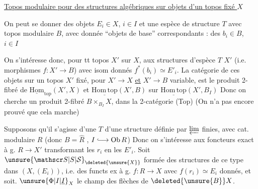 \uline{Topos modulaire pour des structures algébriques
 sur objets  d'un topos fixé  $X$}

 On peut se donner des objets $E_i\in X$, $i\in I$
et  une espèce de structure $T$ avec
topos modulaire $B$,  avec donnée
``objets de base'' correspondants : des $b_i\in B$, $i\in I$

On s'intéresse donc, pour tt topos $X'$ sur $X$,
aux structures d'espèce $T$  $X'$ 
(i.e. morphismes $f:X'\longrightarrow B$)  avec
isom donnés $f^*(b_i)\simeq E'_i$. La catégorie
de ces objets sur un topos $X'$
fixé, pour $X'\longrightarrow X$ \uline{et} $X'\longrightarrow B$
variable, est le produit 2-fibré de $\underline{\mathrm{Hom}}_{\mathrm{top}}(X',X)$ et
$\underline{\mathrm{Hom}\,\mathrm{top}}(X',B)$ sur $\underline{\mathrm{Hom}\,\mathrm{top}}(X',B_I)$
Donc on cherche un produit
2-fibré $B\times_{B_I}X$, dans la 2-catégorie (Top)
(On n'a pas encore prouvé que cela marche)

Supposons qu'il s'agisse d'une $T$ d'une
structure définie par $\varprojlim$ finies, avec cat. modulaire
$R$ (donc $B=\widehat R$ \unsure{$\}$}, $I\lhook\joinrel\longrightarrow\mathrm{Ob}\,R$) Donc on
s'intéresse aux foncteurs exact à g.
$R\longrightarrow X'$ transformant les $r_i$ en les $E'_i$.
Soit $\unsure{\mathscr S|S|\mathcal S}_{\deleted{\unsure{X}}}$  formée des structures
de ce type dans $(X,(E_i))$,  i.e. des functs ex
à g. $f:R\longrightarrow X$ avec $f(r_i)\simeq E_i$ donnés, et
soit. $\unsure{\Phi|I|\underline I}_X$ le champ  des flèches de $\deleted{\unsure{B}}X$.
